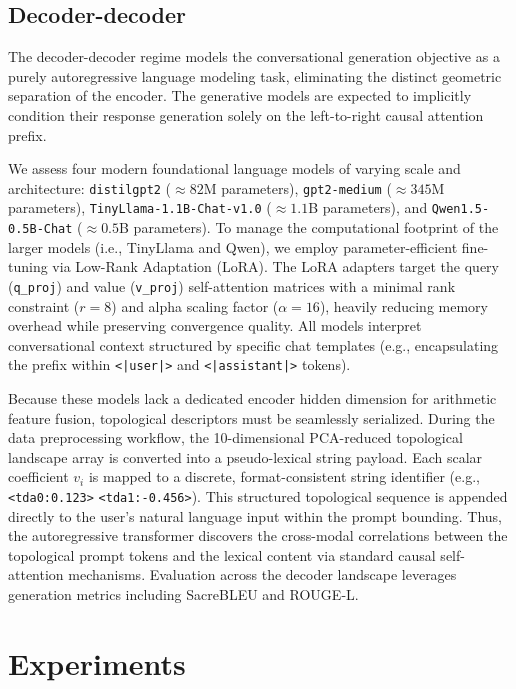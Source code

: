 \documentclass{article}
\begin{document}
\subsection{Decoder-decoder}

The decoder-decoder regime models the conversational generation objective as a purely autoregressive language modeling task, eliminating the distinct geometric separation of the encoder. The generative models are expected to implicitly condition their response generation solely on the left-to-right causal attention prefix. 

We assess four modern foundational language models of varying scale and architecture: \texttt{distilgpt2} ($\approx 82$M parameters), \texttt{gpt2-medium} ($\approx 345$M parameters), \texttt{TinyLlama-1.1B-Chat-v1.0} ($\approx 1.1$B parameters), and \texttt{Qwen1.5-0.5B-Chat} ($\approx 0.5$B parameters). To manage the computational footprint of the larger models (i.e., TinyLlama and Qwen), we employ parameter-efficient fine-tuning via Low-Rank Adaptation (LoRA). The LoRA adapters target the query (\texttt{q\_proj}) and value (\texttt{v\_proj}) self-attention matrices with a minimal rank constraint ($r=8$) and alpha scaling factor ($\alpha=16$), heavily reducing memory overhead while preserving convergence quality. All models interpret conversational context structured by specific chat templates (e.g., encapsulating the prefix within \texttt{<|user|>} and \texttt{<|assistant|>} tokens).

Because these models lack a dedicated encoder hidden dimension for arithmetic feature fusion, topological descriptors must be seamlessly serialized. During the data preprocessing workflow, the 10-dimensional PCA-reduced topological landscape array is converted into a pseudo-lexical string payload. Each scalar coefficient $v_i$ is mapped to a discrete, format-consistent string identifier (e.g., \texttt{<tda0:0.123>} \texttt{<tda1:-0.456>}). This structured topological sequence is appended directly to the user's natural language input within the prompt bounding. Thus, the autoregressive transformer discovers the cross-modal correlations between the topological prompt tokens and the lexical content via standard causal self-attention mechanisms. Evaluation across the decoder landscape leverages generation metrics including SacreBLEU and ROUGE-L.

\section{Experiments}
\end{document}

